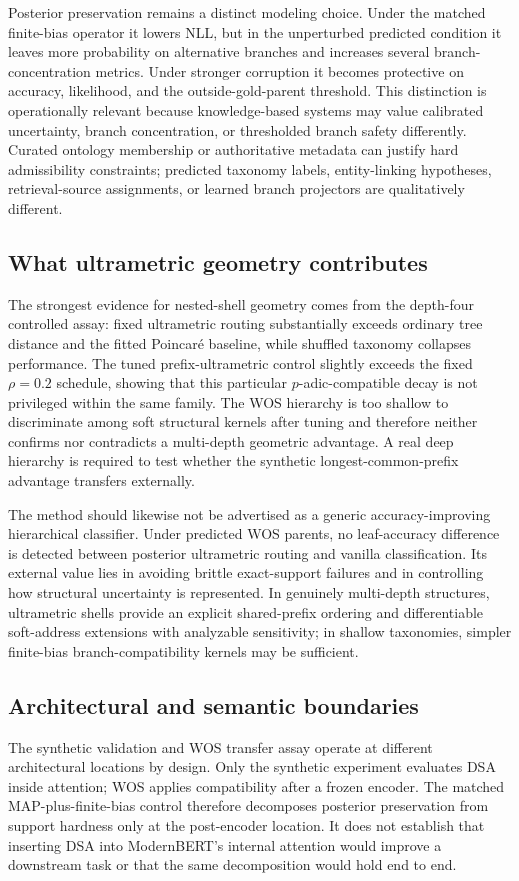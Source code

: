 \documentclass[preprint,11pt]{elsarticle}
\begin{document}
Posterior preservation remains a distinct modeling choice. Under the matched finite-bias operator it lowers NLL, but in the unperturbed predicted condition it leaves more probability on alternative branches and increases several branch-concentration metrics. Under stronger corruption it becomes protective on accuracy, likelihood, and the outside-gold-parent threshold. This distinction is operationally relevant because knowledge-based systems may value calibrated uncertainty, branch concentration, or thresholded branch safety differently. Curated ontology membership or authoritative metadata can justify hard admissibility constraints; predicted taxonomy labels, entity-linking hypotheses, retrieval-source assignments, or learned branch projectors are qualitatively different.

\subsection{What ultrametric geometry contributes}
The strongest evidence for nested-shell geometry comes from the depth-four controlled assay: fixed ultrametric routing substantially exceeds ordinary tree distance and the fitted Poincar\'e baseline, while shuffled taxonomy collapses performance. The tuned prefix-ultrametric control slightly exceeds the fixed $\rho=0.2$ schedule, showing that this particular $p$-adic-compatible decay is not privileged within the same family. The WOS hierarchy is too shallow to discriminate among soft structural kernels after tuning and therefore neither confirms nor contradicts a multi-depth geometric advantage. A real deep hierarchy is required to test whether the synthetic longest-common-prefix advantage transfers externally.

The method should likewise not be advertised as a generic accuracy-improving hierarchical classifier. Under predicted WOS parents, no leaf-accuracy difference is detected between posterior ultrametric routing and vanilla classification. Its external value lies in avoiding brittle exact-support failures and in controlling how structural uncertainty is represented. In genuinely multi-depth structures, ultrametric shells provide an explicit shared-prefix ordering and differentiable soft-address extensions with analyzable sensitivity; in shallow taxonomies, simpler finite-bias branch-compatibility kernels may be sufficient.

\subsection{Architectural and semantic boundaries}
The synthetic validation and WOS transfer assay operate at different architectural locations by design. Only the synthetic experiment evaluates DSA inside attention; WOS applies compatibility after a frozen encoder. The matched MAP-plus-finite-bias control therefore decomposes posterior preservation from support hardness only at the post-encoder location. It does not establish that inserting DSA into ModernBERT's internal attention would improve a downstream task or that the same decomposition would hold end to end.
\end{document}
